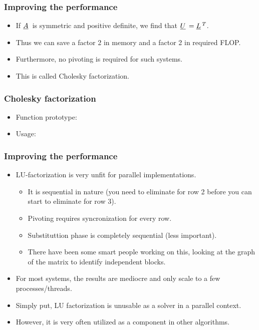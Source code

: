 \documentclass{beamer}
\newcommand{\ub}[1]{\underbar{$#1$}\,}
\begin{document}
\begin{frame}\frametitle{Improving the performance}
  \begin{itemize}
    \item If $\ub{A}$ is symmetric and positive definite, we find that $\ub{U}=\ub{L}^T$.
    \item Thus we can save a factor 2 in memory and a factor 2 in required FLOP.
    \item Furthermore, no pivoting is required for such systems.
    \item This is called Cholesky factorization.
  \end{itemize}
\end{frame}
\begin{frame}\frametitle{Cholesky factorization}
  \begin{itemize}
    \item Function prototype:
      
    \item Usage:
      
  \end{itemize}
\end{frame}
\begin{frame}\frametitle{Improving the performance}
  \begin{itemize}
     \item LU-factorization is very unfit for parallel implementations.
       \begin{itemize}
         \item It is sequential in nature (you need to eliminate for row 2 before you
           can start to eliminate for row 3).
         \item Pivoting requires syncronization for every row.
         \item Substituttion phase is completely sequential (less important).
         \item There have been some smart people working on this, looking at the
           graph of the matrix to identify independent blocks.
       \end{itemize}
     \item For most systems, the results are mediocre and only scale to a 
           few processes/threads.
     \item Simply put, LU factorization is unusable as a solver in a parallel context.
     \item However, it is very often utilized as a component in other algorithms.
  \end{itemize}
\end{frame}
\end{document}
